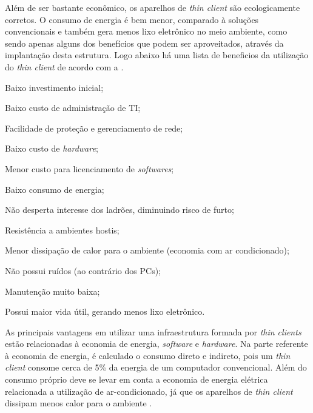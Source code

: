 \documentclass[
	12pt,				%
	openright,			%
	twoside,			%
	a4paper,			%
	chapter=TITLE,		%
	english,			%
	brazil				%
	]{abntex2}
\begin{document}
Além de ser bastante econômico, os aparelhos de \textit{thin client} são ecologicamente corretos. O consumo de energia é bem menor, comparado à soluções convencionais e também gera menos lixo eletrônico no meio ambiente, como sendo apenas alguns dos benefícios que podem ser aproveitados, através da implantação desta estrutura. Logo abaixo há uma lista de beneficios da utilização do \textit{thin client} de acordo com a .

\begin{alineas}
\item Baixo investimento inicial;
\item Baixo custo de administração de TI;
\item Facilidade de proteção e gerenciamento de rede;
\item Baixo custo de \textit{hardware};
\item Menor custo para licenciamento de \textit{softwares};
\item Baixo consumo de energia;
\item Não desperta interesse dos ladrões, diminuindo risco de furto;
\item Resistência a ambientes hostis;
\item Menor dissipação de calor para o ambiente (economia com ar condicionado);
\item Não possui ruídos (ao contrário dos PCs);
\item Manutenção muito baixa;
\item Possui maior vida útil, gerando menos lixo eletrônico.
\end{alineas}

As principais vantagens em utilizar uma infraestrutura formada por \textit{thin clients} estão relacionadas à economia de energia, \textit{software} e \textit{hardware}. Na parte referente à economia de energia, é calculado o consumo direto e indireto, pois um \textit{thin client} consome cerca de 5\% da energia de um computador convencional. Além do consumo próprio deve se levar em conta a economia de energia elétrica relacionada a utilização de ar-condicionado, já que os aparelhos de \textit{thin client} dissipam menos calor para o ambiente \cite{EmailThinClient}.
	 

\begin{table}[h!]
\end{table}
\end{document}
